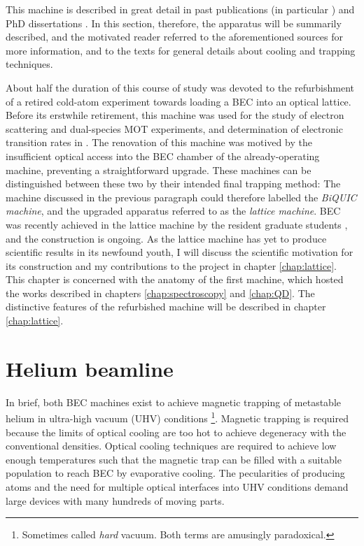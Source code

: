 	This machine is described in great detail in past publications (in particular \cite{swansson04,dall07}) and PhD dissertations \cite{hodgmanthesis,manningthesis,shinthesis,dallthesis}.
	In this section, therefore, the apparatus will be summarily described, and the motivated reader referred to the aforementioned sources for more information, and to the texts \cite{FootAtomic,MetVdS} for general details about cooling and trapping techniques.

	About half the duration of this course of study was devoted to the refurbishment of a retired cold-atom experiment towards loading a \mhe BEC into an optical lattice.
	Before its erstwhile retirement, this machine was used for the study of electron scattering and  dual-species MOT experiments\cite{uhlmann05,byron10,byron10a}, and determination of electronic transition rates \cite{dall08,hodgman09,hodgman09a} in \mhe {}.
	The renovation of this machine was motived by the insufficient optical access into the BEC chamber of the already-operating machine, preventing a straightforward upgrade.
	These machines can be distinguished between these two by their intended final trapping method: The machine discussed in the previous paragraph could therefore labelled the \emph{BiQUIC machine}, and the upgraded apparatus referred to as the \emph{lattice machine}.
	BEC was recently achieved in the lattice machine by the resident graduate students \cite{abbas21}, and the construction is ongoing.
	As the lattice machine has yet to produce scientific results in its newfound youth, I will discuss the scientific motivation for its construction and my contributions to the project in chapter \ref{chap:lattice}.
	This chapter is concerned with the anatomy of the first machine, which hosted the works described in chapters \ref{chap:spectroscopy} and \ref{chap:QD}.
	The distinctive features of the refurbished machine will be described in chapter \ref{chap:lattice}.

\section{Helium beamline}
	In brief, both BEC machines exist to achieve magnetic trapping of metastable helium in ultra-high vacuum (UHV) conditions \footnote{Sometimes called \emph{hard} vacuum.
	Both terms are amusingly paradoxical.}.
	Magnetic trapping is required because the limits of optical cooling are too hot to achieve degeneracy with the conventional densities.
	Optical cooling techniques are required to achieve low enough temperatures such that the magnetic trap can be filled with a suitable population to reach BEC by evaporative cooling.
	The pecularities of producing \mhe atoms and the need for multiple optical interfaces into UHV conditions demand large devices with many hundreds of moving parts.
	

